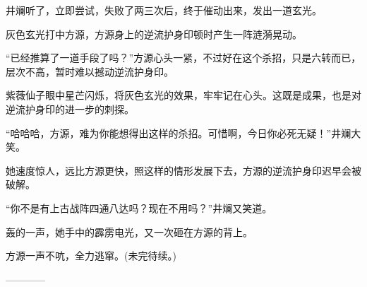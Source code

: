 \begin{this_body}
井斓听了，立即尝试，失败了两三次后，终于催动出来，发出一道玄光。

灰色玄光打中方源，方源身上的逆流护身印顿时产生一阵涟漪晃动。

“已经推算了一道手段了吗？”方源心头一紧，不过好在这个杀招，只是六转而已，层次不高，暂时难以撼动逆流护身印。

紫薇仙子眼中星芒闪烁，将灰色玄光的效果，牢牢记在心头。这既是成果，也是对逆流护身印的进一步的刺探。

“哈哈哈，方源，难为你能想得出这样的杀招。可惜啊，今日你必死无疑！”井斓大笑。

她速度惊人，远比方源更快，照这样的情形发展下去，方源的逆流护身印迟早会被破解。

“你不是有上古战阵四通八达吗？现在不用吗？”井斓又笑道。

轰的一声，她手中的霹雳电光，又一次砸在方源的背上。

方源一声不吭，全力逃窜。(未完待续。)

------------

\end{this_body}


